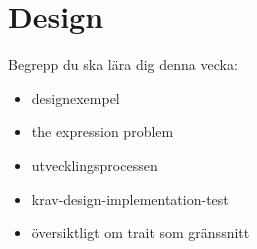 \chapter{Design}\label{chapter:W13}
Begrepp du ska lära dig denna vecka:
\begin{multicols}{2}\begin{itemize}[nosep,label={$\square$},leftmargin=*]
\item designexempel
\item the expression problem
\item utvecklingsprocessen
\item krav-design-implementation-test
\item översiktligt om trait som gränssnitt\end{itemize}\end{multicols}
